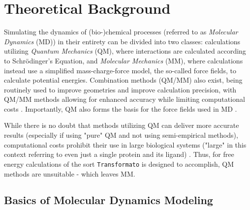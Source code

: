 \documentclass[oneside]{scrreprt}
\begin{document}
\section{Theoretical Background}
Simulating the dynamics of (bio-)chemical processes (referred to as \emph{Molecular Dynamics} (MD)) in their entirety can be divided into two classes: calculations utilizing \emph{Quantum Mechanics} (QM), where interactions are calculated according to Schrödinger's Equation, and \emph{Molecular Mechanics} (MM), where calculations instead use a simplified mass-charge-force model, the so-called force fields, to calculate potential energies. Combination methods (QM/MM) also exist, being routinely used to improve geometries and improve calculation precision, with QM/MM methods allowing for enhanced accuracy while limiting computational costs \cite{tzeliou_review_2022}. Importantly, QM also forms the basis for the force fields used in MD \cite{vanommeslaeghe_charmm_2010}. 

While there is no doubt that methods utilizing QM can deliver more accurate results (especially if using "pure" QM and not using semi-empirical methods), computational costs prohibit their use in large biological systems ("large" in this context referring to even just a single protein and its ligand) \cite{cournia_relative_2017}. Thus, for free energy calculations of the sort \texttt{Transformato} is designed to accomplish, QM methods are unsuitable - which leaves MM.




\subsection{Basics of Molecular Dynamics Modeling}
\end{document}
